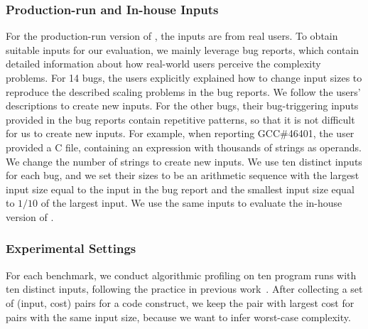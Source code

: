 \subsubsection{Production-run and In-house Inputs}






For the production-run version of \Tool, the inputs
are from real users. 
To obtain suitable inputs for our evaluation, 
we mainly leverage bug reports, 
which contain detailed information about how real-world 
users perceive the complexity problems. 
For 14 bugs, 
the users explicitly explained how to change input sizes 
to reproduce the described scaling problems in the bug reports. 
We follow the users' descriptions to create new inputs. 
For the other bugs, their bug-triggering inputs provided 
in the bug reports contain repetitive patterns, 
so that it is not difficult for us to create new inputs.
For example, when reporting GCC\#46401,
the user provided a C file, 
containing an expression with thousands of strings as operands. 
We change the number of strings to create new inputs. 
We use ten distinct inputs for each bug, 
and we set their sizes 
to be an arithmetic sequence with the largest input size
equal to the input in the bug report and the 
smallest input size equal to $1/10$ 
of the largest input.
We use the same inputs to evaluate the in-house version of \Tool. 





\subsubsection{Experimental Settings}

For each benchmark, we conduct algorithmic profiling on ten 
program runs with ten distinct inputs, following the practice in 
previous work~\cite{joy.asplos13,SongOOPSLA2014}.
After collecting a set of (input, cost) pairs for a code construct,
we keep the pair with largest cost for pairs with the same input size,
because we want to infer worst-case complexity. 


